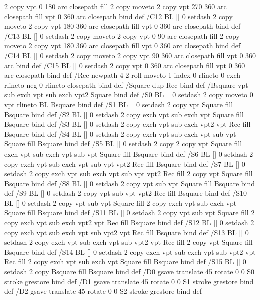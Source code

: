 {{{       2 copy  vpt 0 180 arc closepath fill
       2 copy moveto
       2 copy  vpt 270 360 arc closepath fill
               vpt 0 360 arc closepath } bind def
/C12 { BL [] 0 setdash 2 copy moveto
       2 copy  vpt 180 360 arc closepath fill
               vpt 0 360 arc closepath } bind def
/C13 { BL [] 0 setdash  2 copy moveto
       2 copy  vpt 0 90 arc closepath fill
       2 copy moveto
       2 copy  vpt 180 360 arc closepath fill
               vpt 0 360 arc closepath } bind def
/C14 { BL [] 0 setdash 2 copy moveto
       2 copy  vpt 90 360 arc closepath fill
               vpt 0 360 arc } bind def
/C15 { BL [] 0 setdash 2 copy vpt 0 360 arc closepath fill
               vpt 0 360 arc closepath } bind def
/Rec   { newpath 4 2 roll moveto 1 index 0 rlineto 0 exch rlineto
       neg 0 rlineto closepath } bind def
/Square { dup Rec } bind def
/Bsquare { vpt sub exch vpt sub exch vpt2 Square } bind def
/S0 { BL [] 0 setdash 2 copy moveto 0 vpt rlineto BL Bsquare } bind def
/S1 { BL [] 0 setdash 2 copy vpt Square fill Bsquare } bind def
/S2 { BL [] 0 setdash 2 copy exch vpt sub exch vpt Square fill Bsquare } bind def
/S3 { BL [] 0 setdash 2 copy exch vpt sub exch vpt2 vpt Rec fill Bsquare } bind def
/S4 { BL [] 0 setdash 2 copy exch vpt sub exch vpt sub vpt Square fill Bsquare } bind def
/S5 { BL [] 0 setdash 2 copy 2 copy vpt Square fill
       exch vpt sub exch vpt sub vpt Square fill Bsquare } bind def
/S6 { BL [] 0 setdash 2 copy exch vpt sub exch vpt sub vpt vpt2 Rec fill Bsquare } bind def
/S7 { BL [] 0 setdash 2 copy exch vpt sub exch vpt sub vpt vpt2 Rec fill
       2 copy vpt Square fill
       Bsquare } bind def
/S8 { BL [] 0 setdash 2 copy vpt sub vpt Square fill Bsquare } bind def
/S9 { BL [] 0 setdash 2 copy vpt sub vpt vpt2 Rec fill Bsquare } bind def
/S10 { BL [] 0 setdash 2 copy vpt sub vpt Square fill 2 copy exch vpt sub exch vpt Square fill
       Bsquare } bind def
/S11 { BL [] 0 setdash 2 copy vpt sub vpt Square fill 2 copy exch vpt sub exch vpt2 vpt Rec fill
       Bsquare } bind def
/S12 { BL [] 0 setdash 2 copy exch vpt sub exch vpt sub vpt2 vpt Rec fill Bsquare } bind def
/S13 { BL [] 0 setdash 2 copy exch vpt sub exch vpt sub vpt2 vpt Rec fill
       2 copy vpt Square fill Bsquare } bind def
/S14 { BL [] 0 setdash 2 copy exch vpt sub exch vpt sub vpt2 vpt Rec fill
       2 copy exch vpt sub exch vpt Square fill Bsquare } bind def
/S15 { BL [] 0 setdash 2 copy Bsquare fill Bsquare } bind def
/D0 { gsave translate 45 rotate 0 0 S0 stroke grestore } bind def
/D1 { gsave translate 45 rotate 0 0 S1 stroke grestore } bind def
/D2 { gsave translate 45 rotate 0 0 S2 stroke grestore } bind def
}}
